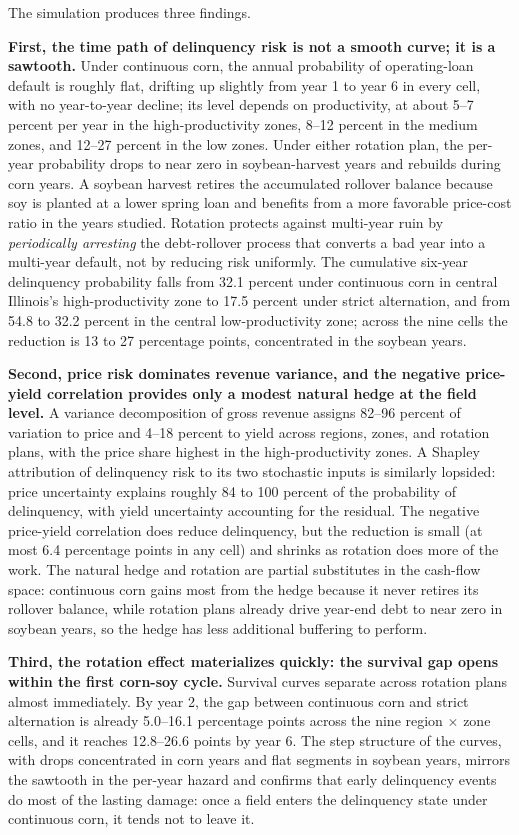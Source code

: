 \documentclass[11pt,letterpaper]{article}
\theoremstyle{remark}
\begin{document}
The simulation produces three findings.
 
\textbf{First, the time path of delinquency risk is not a smooth curve; it is a sawtooth.} Under continuous corn, the annual probability of operating-loan default is roughly flat, drifting up slightly from year 1 to year 6 in every cell, with no year-to-year decline; its level depends on productivity, at about 5--7 percent per year in the high-productivity zones, 8--12 percent in the medium zones, and 12--27 percent in the low zones. Under either rotation plan, the per-year probability drops to near zero in soybean-harvest years and rebuilds during corn years. A soybean harvest retires the accumulated rollover balance because soy is planted at a lower spring loan and benefits from a more favorable price-cost ratio in the years studied. Rotation protects against multi-year ruin by \textit{periodically arresting} the debt-rollover process that converts a bad year into a multi-year default, not by reducing risk uniformly. The cumulative six-year delinquency probability falls from 32.1 percent under continuous corn in central Illinois's high-productivity zone to 17.5 percent under strict alternation, and from 54.8 to 32.2 percent in the central low-productivity zone; across the nine cells the reduction is 13 to 27 percentage points, concentrated in the soybean years.
 
\textbf{Second, price risk dominates revenue variance, and the negative price-yield correlation provides only a modest natural hedge at the field level.} A variance decomposition of gross revenue assigns 82--96 percent of variation to price and 4--18 percent to yield across regions, zones, and rotation plans, with the price share highest in the high-productivity zones. A Shapley attribution of delinquency risk to its two stochastic inputs is similarly lopsided: price uncertainty explains roughly 84 to 100 percent of the probability of delinquency, with yield uncertainty accounting for the residual. The negative price-yield correlation does reduce delinquency, but the reduction is small (at most 6.4 percentage points in any cell) and shrinks as rotation does more of the work. The natural hedge and rotation are partial substitutes in the cash-flow space: continuous corn gains most from the hedge because it never retires its rollover balance, while rotation plans already drive year-end debt to near zero in soybean years, so the hedge has less additional buffering to perform.
 
\textbf{Third, the rotation effect materializes quickly: the survival gap opens within the first corn-soy cycle.} Survival curves separate across rotation plans almost immediately. By year 2, the gap between continuous corn and strict alternation is already 5.0--16.1 percentage points across the nine region $\times$ zone cells, and it reaches 12.8--26.6 points by year 6. The step structure of the curves, with drops concentrated in corn years and flat segments in soybean years, mirrors the sawtooth in the per-year hazard and confirms that early delinquency events do most of the lasting damage: once a field enters the delinquency state under continuous corn, it tends not to leave it.
 
\end{document}
